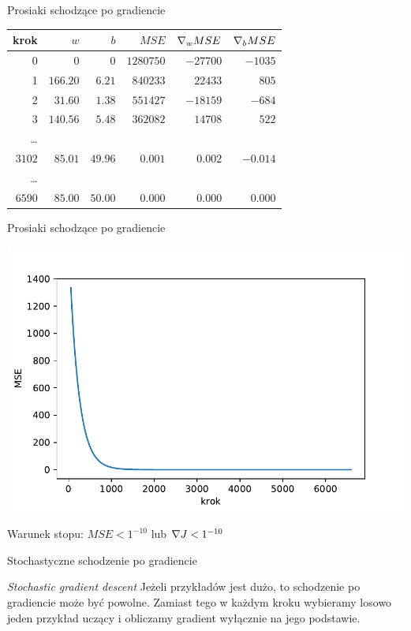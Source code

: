 \documentclass{sa}
\newcommand{\grad}{\ensuremath\nabla}
\begin{document}
\begin{frame}{Prosiaki schodzące po gradiencie}
\begin{center}
\begin{tabular}{rrrrrr}
krok & $w$ & $b$ & $MSE$ & $\grad_w MSE$ & $\grad_b MSE$ \\
\hline
0 & 0 & 0 & $1280750$ & $-27700$ & $-1035$ \\
1 & $166.20$ & $6.21$ & $840233$ & $22433$ & $805$ \\
2 & $31.60$ & $1.38$ & $551427$ & $-18159$ & $-684$ \\
3 & $140.56$ & $5.48$ & $362082$ & $14708$ & $522$ \\
\ldots \\
$3102$ & $85.01$ & $49.96$ & $0.001$ & $0.002$ & $-0.014$ \\
\ldots \\
$6590$ & $85.00$ & $50.00$ & $0.000$ & $0.000$ & $0.000$ \\
\end{tabular}
\end{center}
\end{frame}


\begin{frame}{Prosiaki schodzące po gradiencie}
\begin{center}
\includegraphics[width=.9\textwidth]{grad-prosiaki.pdf}
\end{center}

Warunek stopu: $MSE<1^{-10}$ lub $\grad J<1^{-10}$
\end{frame}

\begin{frame}{Stochastyczne schodzenie po gradiencie}
\begin{block}{\emph{Stochastic gradient descent}}
Jeżeli przykładów jest dużo, to schodzenie po gradiencie może być powolne.
Zamiast tego w każdym kroku wybieramy losowo \alert{jeden} przykład uczący i obliczamy gradient wyłącznie na jego podstawie.
\end{block}
\end{frame}
\end{document}
